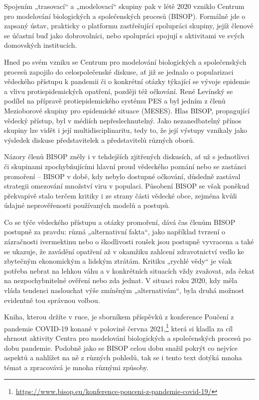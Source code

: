 Spojením „trasovací“ a „modelovací“ skupiny pak v létě 2020 vzniklo Centrum pro modelování biologických a společenských procesů (BISOP). Formálně jde o zapsaný ústav, prakticky o platformu zastřešující spolupráci skupiny, jejíž členové 
se účastní buď jako dobrovolníci, nebo spolupráci spojují s aktivitami ve svých domovských institucích. 

Hned po svém vzniku se Centrum pro modelování biologických a společenských procesů zapojilo do celospolečenské diskuse, ať již se jednalo o popularizaci vědeckého přístupu k pandemii či o konkrétní otázky týkající se vývoje epidemie a vlivu protiepidemických opatření, později též očkování. René Levínský se podílel na přípravě protiepidemického systému PES a byl jedním z členů Mezioborové skupiny pro epidemické situace (MESES). Hlas BISOP, propagující vědecký přístup, byl v médiích nepřeslechnutelný. Jako nezanedbatelný přínos skupiny lze vidět i její multidisciplinaritu, tedy to,  že její výstupy vznikaly jako výsledek diskuse představitelek a představitelů různých oborů.

Názory členů BISOP zněly i v tehdejších zjitřených diskusích, ať už s jednotlivci či skupinami zpochybňujícími hlavní proud vědeckého poznání nebo se zastánci promoření -- BISOP v době, kdy nebylo dostupné očkování, důsledně zastával strategii omezování množství viru v populaci. Působení BISOP se však poněkud překvapivě stalo terčem kritiky i ze strany části vědecké obce, zejména kvůli údajné neprověřenosti používaných modelů a postupů. 

Co se týče vědeckého přístupu a otázky promoření, dává čas členům BISOP postupně za pravdu: různá „alternativní fakta“, jako například tvrzení o zázračnosti ivermektinu nebo o škodlivosti roušek jsou postupně vyvracena a také se ukazuje, že zavádění opatření až v okamžiku zahlcení zdravotnictví vedlo ke zbytečným ekonomickým a lidským ztrátám. Kritiku „rychlé vědy“ je však potřeba nebrat na lehkou váhu a v konkrétních situacích vždy zvažovat, zda čekat na nezpochybnitelné ověření nebo zda jednat. V situaci roku 2020, kdy měla vláda tendenci naslouchat výše zmíněným „alternativám“, byla druhá možnost evidentně tou správnou volbou.

Kniha, kterou držíte v ruce, je sborníkem příspěvků z konference Poučení z pandemie COVID-19 konané v polovině června 2021,\footnote{\url{https://www.bisop.eu/konference-pouceni-z-pandemie-covid-19/}} která si kladla za cíl shrnout aktivity Centra pro modelování biologických a společenských procesů po dobu pandemie. Podobně jako se BISOP celou dobu snažil pokrýt co nejvíce aspektů a nahlížet na ně z různých pohledů, tak se i tento text dotýká mnoha témat a zpracovává je mnoha různými způsoby.

